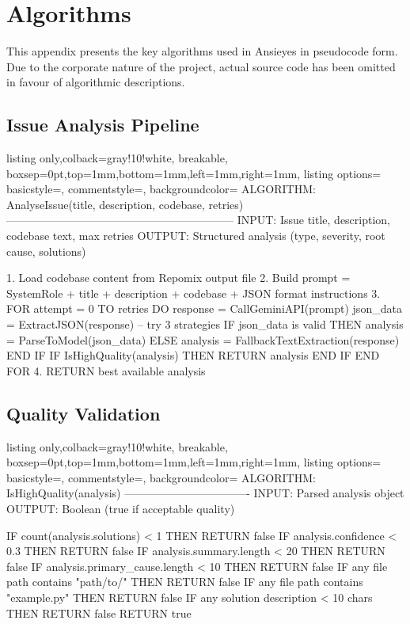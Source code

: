 \chapter{Algorithms}

This appendix presents the key algorithms used in Ansieyes in pseudocode form. Due to the corporate nature of the project, actual source code has been omitted in favour of algorithmic descriptions.

\section{Issue Analysis Pipeline}

\begin{tcblisting}{listing only,colback=gray!10!white, breakable, boxsep=0pt,top=1mm,bottom=1mm,left=1mm,right=1mm,
listing options={
basicstyle=\small\ttfamily,
commentstyle=\color{gray},
backgroundcolor=\color{gray!25}}}
ALGORITHM: AnalyseIssue(title, description, codebase, retries)
--------------------------------------------------------------
INPUT:  Issue title, description, codebase text, max retries
OUTPUT: Structured analysis (type, severity, root cause, solutions)

1. Load codebase content from Repomix output file
2. Build prompt = SystemRole + title + description + codebase
                  + JSON format instructions
3. FOR attempt = 0 TO retries DO
     response = CallGeminiAPI(prompt)
     json_data = ExtractJSON(response)   -- try 3 strategies
     IF json_data is valid THEN
       analysis = ParseToModel(json_data)
     ELSE
       analysis = FallbackTextExtraction(response)
     END IF
     IF IsHighQuality(analysis) THEN
       RETURN analysis
     END IF
   END FOR
4. RETURN best available analysis
\end{tcblisting}

\section{Quality Validation}

\begin{tcblisting}{listing only,colback=gray!10!white, breakable, boxsep=0pt,top=1mm,bottom=1mm,left=1mm,right=1mm,
listing options={
basicstyle=\small\ttfamily,
commentstyle=\color{gray},
backgroundcolor=\color{gray!25}}}
ALGORITHM: IsHighQuality(analysis)
----------------------------------
INPUT:  Parsed analysis object
OUTPUT: Boolean (true if acceptable quality)

IF count(analysis.solutions) < 1       THEN RETURN false
IF analysis.confidence < 0.3           THEN RETURN false
IF analysis.summary.length < 20        THEN RETURN false
IF analysis.primary_cause.length < 10  THEN RETURN false
IF any file path contains "path/to/"   THEN RETURN false
IF any file path contains "example.py" THEN RETURN false
IF any solution description < 10 chars THEN RETURN false
RETURN true
\end{tcblisting}

